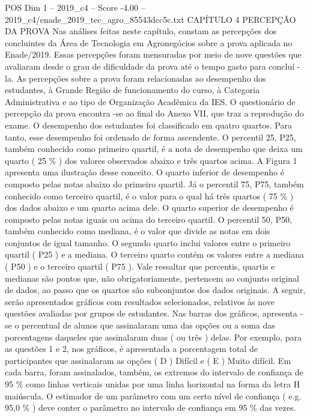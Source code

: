 \begin{textsample}{POS Dim 1 – 2019\_c4 – Score -4.00 – 2019\_c4/enade\_2019\_tec\_agro\_85543dcc5c.txt}  \label{ex:f1_pos_346}
CAPÍTULO 4 PERCEPÇÃO DA PROVA Nas análises feitas neste capítulo, constam as percepções dos concluintes da Área de Tecnologia em Agronegócios sobre a prova aplicada no Enade/2019.
Essas percepções foram mensuradas por meio de nove questões que avaliaram desde o grau de dificuldade da prova até o tempo gasto para concluí -la.
As percepções sobre a prova foram relacionadas ao desempenho dos estudantes, à Grande Região de funcionamento do curso, à Categoria Administrativa e ao tipo de Organização Acadêmica da IES.
O questionário de percepção da prova encontra -se ao final do Anexo VII, que traz a reprodução do exame.
O desempenho dos estudantes foi classificado em quatro quartos.
Para tanto, esse desempenho foi ordenado de forma ascendente.
O percentil 25, P25, também conhecido como primeiro quartil, é a nota de desempenho que deixa um quarto ( 25 \% ) dos valores observados abaixo e três quartos acima.
A Figura 1 apresenta uma ilustração desse conceito.
O quarto inferior de desempenho é composto pelas notas abaixo do primeiro quartil.
Já o percentil 75, P75, também conhecido como terceiro quartil, é o valor para o qual há três quartos ( 75 \% ) dos dados abaixo e um quarto acima dele.
O quarto superior de desempenho é composto pelas notas iguais ou acima do terceiro quartil.
O percentil 50, P50, também conhecido como mediana, é o valor que divide as notas em dois conjuntos de igual tamanho.
O segundo quarto inclui valores entre o primeiro quartil ( P25 ) e a mediana.
O terceiro quarto contém os valores entre a mediana ( P50 ) e o terceiro quartil ( P75 ).
Vale ressaltar que percentis, quartis e medianas são pontos que, não obrigatoriamente, pertencem ao conjunto original de dados, ao passo que os quartos são subconjuntos dos dados originais.
A seguir, serão apresentados gráficos com resultados selecionados, relativos às nove questões avaliadas por grupos de estudantes.
Nas barras dos gráficos, apresenta -se o percentual de alunos que assinalaram uma das opções ou a soma das porcentagens daqueles que assinalaram duas ( ou três ) delas.
Por exemplo, para as questões 1 e 2, nos gráficos, é apresentada a porcentagem total de participantes que assinalaram as opções ( D ) Difícil e ( E ) Muito difícil.
Em cada barra, foram assinalados, também, os extremos do intervalo de confiança de 95 \% como linhas verticais unidas por uma linha horizontal na forma da letra H maiúscula.
O estimador de um parâmetro com um certo nível de confiança ( e.g. 95,0 \% ) deve conter o parâmetro no intervalo de confiança em 95 \% das vezes.

\end{textsample}
